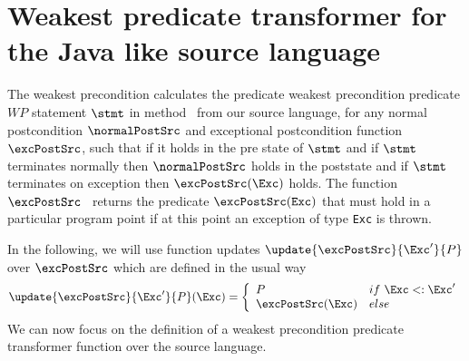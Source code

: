 


\section{Weakest predicate transformer for the Java like source language } \label{pog:wpSrcGeneral}

The weakest precondition calculates  the predicate weakest precondition predicate $WP$  statement $\stmt$ in method \methodd \ from our source language,
for any normal postcondition $\normalPostSrc$ and exceptional postcondition function $\excPostSrc$, 
 such that if it holds in the pre state of $\stmt$ and   if $\stmt$ terminates normally then $\normalPostSrc$  holds in the poststate and
 if $\stmt$ terminates on exception \Exc{} then $\excPostSrc(\Exc)$ holds. 
The function $\excPostSrc$ \ returns the predicate $\excPostSrc (\mbox{\rm\texttt{Exc}}) $ that must hold in a particular program point if
 at this point an exception of type \mbox{\rm\texttt{Exc}} is thrown.

In the following, we will use function updates $\update{\excPostSrc}{\Exc'}{ P } $ over $\excPostSrc $ which are defined in the usual way
$$
\update{\excPostSrc}{\Exc'}{ P }( \Exc )  = 
       \left\{\begin{array}{ll} 
         P & if \ \Exc  <: \Exc'  \\
         \excPostSrc(\Exc ) & else 
     \end{array}\right.$$
We can now  focus on the definition of a weakest precondition predicate transformer function over the source language.
